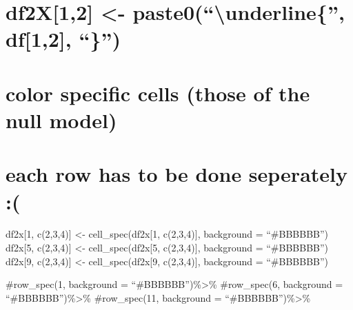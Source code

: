 \documentclass[]{article}
\begin{document}
\section{\texorpdfstring{df2X{[}1,2{]} \textless{}-
paste0(``\textbackslash{}underline\{'', df{[}1,2{]},
``\}'')}{df2X{[}1,2{]} \textless{}- paste0(\textbackslash{}underline\{, df{[}1,2{]}, \})}}\label{df2x12---paste0underline-df12}

\section{color specific cells (those of the null
model)}\label{color-specific-cells-those-of-the-null-model}

\section{each row has to be done seperately
:(}\label{each-row-has-to-be-done-seperately}

df2x{[}1, c(2,3,4){]} \textless{}- cell\_spec(df2x{[}1, c(2,3,4){]},
background = ``\#BBBBBB'') df2x{[}5, c(2,3,4){]} \textless{}-
cell\_spec(df2x{[}5, c(2,3,4){]}, background = ``\#BBBBBB'') df2x{[}9,
c(2,3,4){]} \textless{}- cell\_spec(df2x{[}9, c(2,3,4){]}, background =
``\#BBBBBB'')

\#row\_spec(1, background = ``\#BBBBBB'')\%\textgreater{}\%
\#row\_spec(6, background = ``\#BBBBBB'')\%\textgreater{}\%
\#row\_spec(11, background = ``\#BBBBBB'')\%\textgreater{}\%
\end{document}
